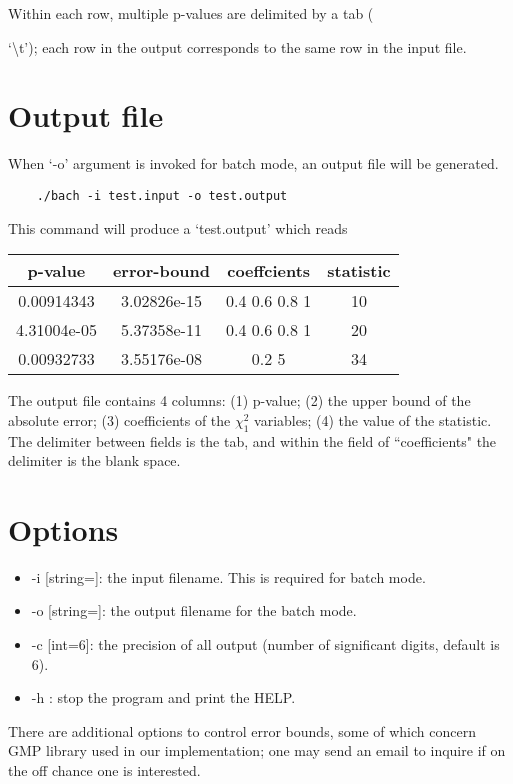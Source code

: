 \documentclass[11pt, Palatino]{article}
\begin{document}
Within each row, multiple p-values are delimited by a tab ({`\textbackslash{t}');  each row in the output corresponds to the same row in the input file.   
  
\section{Output file}  
When `-o' argument is invoked for batch mode, an output file will be generated. 
\begin{verbatim}
	./bach -i test.input -o test.output
\end{verbatim}
This command will produce a `test.output' which reads
\begin{center}
{
\begin{tabular}{c c c c}
p-value &	error-bound & coeffcients & statistic \\
\hline
0.00914343	& 	3.02826e-15 & 0.4 0.6 0.8 1 & 10 \\
4.31004e-05 &	5.37358e-11 & 0.4 0.6 0.8 1 & 20 \\
0.00932733	& 3.55176e-08 & 0.2  5 & 34\\
\end{tabular} 
}
\end{center} 
The output file contains 4 columns: (1) p-value; (2) the upper bound of the absolute error; (3) coefficients of the $\chi_1^2$ variables; (4) the value of the statistic. 
The delimiter between fields is the tab, and within the field of ``coefficients" the delimiter is the blank space.  
 
\section{Options}
\begin{flushleft}
\begin{itemize}
\item -i [string=]: the input filename. This is required for batch mode. 
\item -o [string=]: the output filename for the batch mode. 
\item -c [int=6]: the precision of all output (number of significant digits, default is 6).
\item -h : stop the program and print the HELP.
\end{itemize}  
\medskip
There are additional options to control error bounds, some of which concern GMP library used in our implementation; one may send an email to inquire if on the off chance one is interested.  
\end{flushleft}


}
\end{document}

